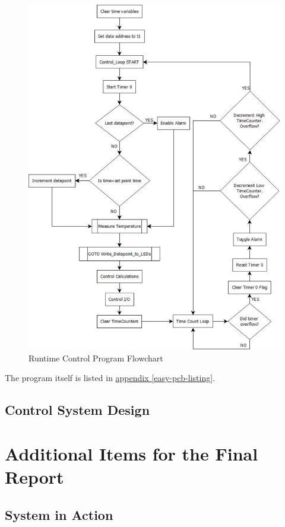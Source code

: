 \documentclass[10pt, twocolumn]{article}
\begin{document}
\begin{figure}
	\centering
	\includegraphics[width=\textwidth]{Figures/control-flowchart.pdf}
	\caption{Runtime Control Program Flowchart}
	\label{control-flowchart}
\end{figure}

The program itself is listed in
\hyperref[easy-pcb-listing]{appendix \ref{easy-pcb-listing}}.

\subsection{Control System Design}

\section{Additional Items for the Final Report}

\subsection{System in Action}
\end{document}
